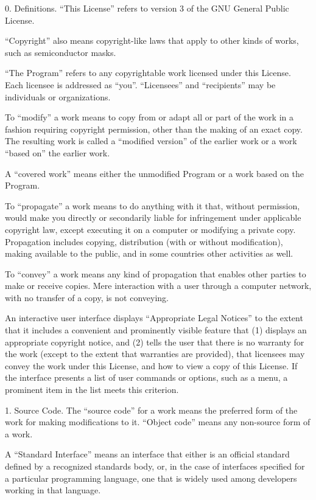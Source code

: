 
0. Definitions.
“This License” refers to version 3 of the GNU General Public License.

“Copyright” also means copyright-like laws that apply to other kinds of works, such as semiconductor masks.

“The Program” refers to any copyrightable work licensed under this License. Each licensee is addressed as “you”. “Licensees” and “recipients” may be individuals or organizations.

To “modify” a work means to copy from or adapt all or part of the work in a fashion requiring copyright permission, other than the making of an exact copy. The resulting work is called a “modified version” of the earlier work or a work “based on” the earlier work.

A “covered work” means either the unmodified Program or a work based on the Program.

To “propagate” a work means to do anything with it that, without permission, would make you directly or secondarily liable for infringement under applicable copyright law, except executing it on a computer or modifying a private copy. Propagation includes copying, distribution (with or without modification), making available to the public, and in some countries other activities as well.

To “convey” a work means any kind of propagation that enables other parties to make or receive copies. Mere interaction with a user through a computer network, with no transfer of a copy, is not conveying.

An interactive user interface displays “Appropriate Legal Notices” to the extent that it includes a convenient and prominently visible feature that (1) displays an appropriate copyright notice, and (2) tells the user that there is no warranty for the work (except to the extent that warranties are provided), that licensees may convey the work under this License, and how to view a copy of this License. If the interface presents a list of user commands or options, such as a menu, a prominent item in the list meets this criterion.

1. Source Code.
The “source code” for a work means the preferred form of the work for making modifications to it. “Object code” means any non-source form of a work.

A “Standard Interface” means an interface that either is an official standard defined by a recognized standards body, or, in the case of interfaces specified for a particular programming language, one that is widely used among developers working in that language.

